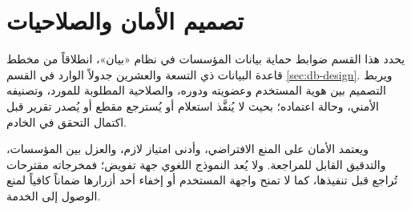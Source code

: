 \section{تصميم الأمان والصلاحيات}
\label{sec:security-design}

يحدد هذا القسم ضوابط حماية بيانات المؤسسات في نظام «بيان»، انطلاقاً من مخطط قاعدة البيانات ذي التسعة والعشرين جدولاً الوارد في القسم \ref{sec:db-design}. ويربط التصميم بين هوية المستخدم وعضويته ودوره، والصلاحية المطلوبة للمورد، وتصنيفه الأمني، وحالة اعتماده؛ بحيث لا يُنفَّذ استعلام أو يُسترجع مقطع أو يُصدر تقرير قبل اكتمال التحقق في الخادم.

ويعتمد الأمان على المنع الافتراضي، وأدنى امتياز لازم، والعزل بين المؤسسات، والتدقيق القابل للمراجعة. ولا يُعد النموذج اللغوي جهة تفويض؛ فمخرجاته مقترحات تُراجع قبل تنفيذها، كما لا تمنح واجهة المستخدم أو إخفاء أحد أزرارها ضماناً كافياً لمنع الوصول إلى الخدمة.

